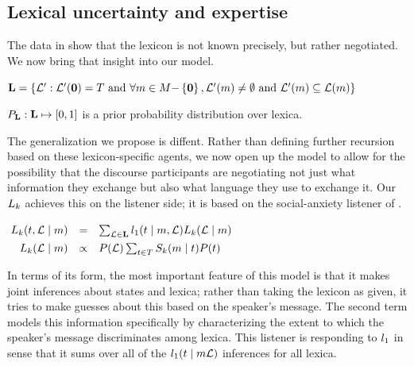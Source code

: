 \documentclass{article}
\begin{document}

\subsection{Lexical uncertainty and expertise}\label{sec:full}

The data in  show that the lexicon is not known
precisely, but rather negotiated. We now bring that insight into our
model.
%
\begin{examples}
\item\label{model-extend}
  \begin{examples} 
  \item\label{lexset}%
      $\mathbf{L} = \left\{ \mathcal{L}' : \mathcal{L}'(\mathbf{0}) = T \text{ and } 
      \forall m \in M{-}\left\{ \mathbf{0} \right\}, 
      \mathcal{L}'(m) \neq \emptyset \text{ and } 
      \mathcal{L}'(m) \subseteq \mathcal{L}(m) \right\}$
  \item\label{LexPrior}%
    $P_{\mathbf{L}} : \mathbf{L} \mapsto [0,1]$ is a prior
    probability distribution over lexica.  
  \end{examples}
\end{examples}

The generalization we propose is diffent. Rather than defining further
recursion based on these lexicon-specific agents, we now open up the
model to allow for the possibility that the discourse participants are
negotiating not just what information they exchange but also what
language they use to exchange it. Our $L_{k}$ achieves this on
the listener side; it is based on the social-anxiety listener of
\citet{Smith:Goodman:Frank:2013}.
%
\begin{examples}
  \item\label{Lk}%
    \setlength{\arraycolsep}{2pt}%
    $\mspace{-4mu}\begin{array}[t]{r c l}
      L_{k}(t, \mathcal{L} \mid m) 
      &=&
      \sum_{\mathcal{L} \in \mathbf{L}} l_{1}(t \mid m, \mathcal{L}) L_{k}(\mathcal{L} \mid m) 
      \\[1ex]
      L_{k}(\mathcal{L} \mid m) 
      &\propto& 
      P(\mathcal{L}) \sum_{t\in T} S_{k}(m \mid t)P(t)
    \end{array}$
\end{examples}
%
In terms of its form, the most important feature of this model is that
it makes joint inferences about states and lexica; rather than taking
the lexicon as given, it tries to make guesses about this based on the
speaker's message. The second term models this information
specifically by characterizing the extent to which the speaker's
message discriminates among lexica. This listener is responding to
$l_{1}$ in sense that it sums over all of the
$l_{1}(t\mid m\mathcal{L})$ inferences for all lexica.
  
\end{document}
